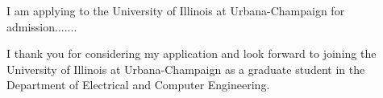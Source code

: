 \documentclass[12pt,oneside]{my_sop}
\begin{document}
\begin{center}{\huge \scshape {}}\end{center}
\begin{center} 
    {\Large 
    }
\end{center}
\vspace*{\baselineskip}
\hspace*{\parindent}I am applying to the University of Illinois at Urbana-Champaign for admission.......

\pagebreak

I thank you for considering my application and look forward to joining the University of Illinois at Urbana-Champaign as a graduate student in the Department of Electrical and Computer Engineering.
\end{document}
